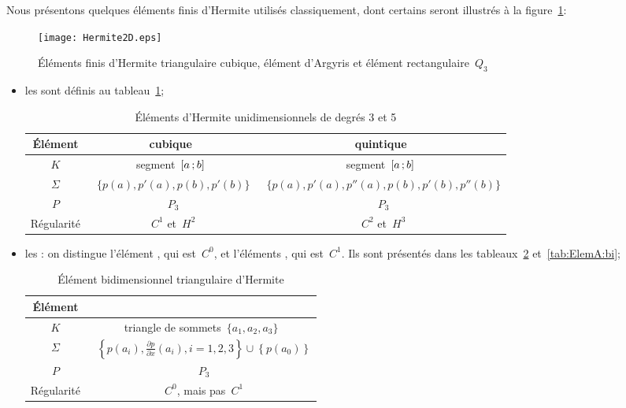 Nous présentons quelques éléments finis d'Hermite utilisés classiquement, dont certains seront illustrés
à la figure~\ref{Hermite2D}:
\begin{figure}[ht]
\centering
\texttt{[image: Hermite2D.eps]}
\caption{Éléments finis d'Hermite triangulaire cubique, élément d'Argyris et élément rectangulaire~$Q_3$}\label{Hermite2D}
\end{figure}
\begin{itemize}
\item les  sont définis au tableau~\ref{tab:ElemH:uni};
\begin{table}[ht]\centering\small
\begin{tabular}{c|cc}
Élément & cubique & quintique\\
\hline
$K$	  & segment~$\mathopen{[}a\,;b\mathclose{]}$ & segment~$\mathopen{[}a\,;b\mathclose{]}$\\
$\Sigma$ &~$\{p(a), p'(a), p(b), p'(b)\}$ &~$\{p(a), p'(a), p''(a), p(b), p'(b), p''(b)\}$\\
$P$   &~$P_3$ &~$P_3$\\
Régularité &~$C^1$ et~$H^2$ &~$C^2$ et~$H^3$\\
\hline
\end{tabular}
\caption{Éléments d'Hermite unidimensionnels de degrés 3 et 5}\label{tab:ElemH:uni}
\end{table}
\item les :
	on distingue l'élément , qui est~$C^0$, et
  l'éléments , qui est~$C^1$.
	Ils sont présentés dans les tableaux~\ref{tab:ElemH:bi} et~\ref{tab:ElemA:bi};
\begin{table}[ht]\centering\small
\begin{tabular}{c|c}
Élément &\\
\hline
$K$	  & triangle de sommets~$\{a_1, a_2, a_3\}$\\
$\Sigma$ &~$\left\{p(a_i), \frac{\partial p}{\partial x}(a_i), i=1, 2, 3\right\} \cup\left\{p(a_0)\right\}$\\
$P$   &~$P_3$\\
Régularité &~$C^0$, mais pas~$C^1$\\
\hline
\end{tabular}\caption{Élément bidimensionnel triangulaire d'Hermite}\label{tab:ElemH:bi}
\end{table}
\begin{table}\centering\small
\begin{tabular}{c|cc}

\end{tabular}
\end{table}
\end{itemize}

